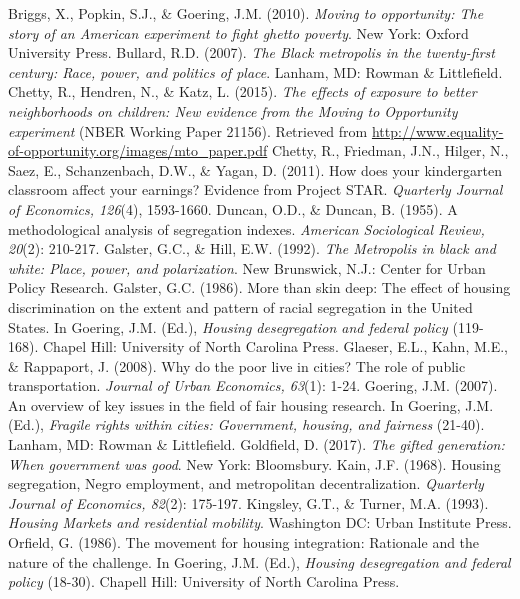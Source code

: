\documentclass[paper=letter, fontsize=12pt]{scrartcl} %
\begin{document}
\begin{thebibliography}{9}
Briggs, X., Popkin, S.J., \& Goering, J.M. (2010). \textit{Moving to opportunity: The story of an American experiment to fight ghetto poverty}. New York: Oxford University Press.
Bullard, R.D. (2007). \textit{The Black metropolis in the twenty-first century: Race, power, and politics of place}. Lanham, MD: Rowman \& Littlefield.
Chetty, R., Hendren, N., \& Katz, L. (2015). \textit{The effects of exposure to better neighborhoods on children: New evidence from the Moving to Opportunity experiment} (NBER Working Paper 21156). Retrieved from \href{http://www.equality-of-opportunity.org/images/mto_paper.pdf}{http://www.equality-of-opportunity.org/images/mto\_paper.pdf}
Chetty, R., Friedman, J.N., Hilger, N., Saez, E., Schanzenbach, D.W., \& Yagan, D. (2011). How does your kindergarten classroom affect your earnings? Evidence from Project STAR. \textit{Quarterly Journal of Economics, 126}(4), 1593-1660.
Duncan, O.D., \& Duncan, B. (1955). A methodological analysis of segregation indexes. \textit{American Sociological Review, 20}(2): 210-217.
Galster, G.C., \& Hill, E.W. (1992). \textit{The Metropolis in black and white: Place, power, and polarization}. New Brunswick, N.J.: Center for Urban Policy Research.
Galster, G.C. (1986). More than skin deep: The effect of housing discrimination on the extent and pattern of racial segregation in the United States. In Goering, J.M. (Ed.), \textit{Housing desegregation and federal policy} (119-168). Chapel Hill: University of North Carolina Press.
Glaeser, E.L., Kahn, M.E., \& Rappaport, J. (2008). Why do the poor live in cities? The role of public transportation. \textit{Journal of Urban Economics, 63}(1): 1-24.
Goering, J.M. (2007). An overview of key issues in the field of fair housing research. In Goering, J.M. (Ed.), \textit{Fragile rights within cities: Government, housing, and fairness} (21-40). Lanham, MD: Rowman \& Littlefield.
Goldfield, D. (2017). \textit{The gifted generation: When government was good}. New York: Bloomsbury.
Kain, J.F. (1968). Housing segregation, Negro employment, and metropolitan decentralization. \textit{Quarterly Journal of Economics, 82}(2): 175-197.
Kingsley, G.T., \& Turner, M.A. (1993). \textit{Housing Markets and residential mobility}. Washington DC: Urban Institute Press.
Orfield, G. (1986). The movement for housing integration: Rationale and the nature of the challenge. In Goering, J.M. (Ed.), \textit{Housing desegregation and federal policy} (18-30). Chapell Hill: University of North Carolina Press. 

\end{thebibliography}
\end{document}
